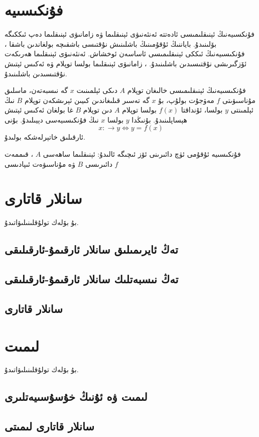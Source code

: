 \section{فۇنكىسىيە}
فۇنكسىيەنىڭ ئېنىقلىمىسى ئادەتتە ئەنئەنىۋى ئېنىقلىما ۋە زامانىۋى ئېنىقلىما دەپ ئىككىگە بۆلىنىدۇ. باياننىڭ ئۇقۇمىنىڭ باشلىنىش نۇقتىسى باشقىچە بولغاندىن باشقا ، فۇنكىسىيەنىڭ ئىككى ئېنىقلىمىسى ئاساسەن ئوخشاش. ئەنئەنىۋى ئېنىقلىما ھەرىكەت ئۆزگىرىشى نۇقتىسىدىن باشلىنىدۇ. ، زامانىۋى ئېنىقلىما بولسا توپلام ۋە ئەكىس ئېتىش نۇقتىسىدىن باشلىنىدۇ.

\begin{MyDefinition}{فۇنكىسىيەنىڭ ئېنىقلىمىسى}{}
 خالىغان توپلام $A$ دىكى ئېلمىنىت $x$ گە نىسبەتەن، ماسلىق مۇناسىۋىتى $f$ مەۋجۇت بولۇپ، بۇ $x$ گە تەسىر قىلىغاندىن كىيىن ئېرىشكەن توپلام $B$ نىڭ ئېلمىنتى $y$ بولسا، ئۇنداقتا $f(x)$ بولسا توپلام $A$ دىن توپلام $B$ غا بولغان ئەكىس ئېتىش ھېساپلىنىدۇ. بۇنىڭدا $y$ بولسا $x$ نىڭ فۇنكىسىيەسى دېيىلىدۇ. بۇنى 
 $$x:\rightarrow y \Leftrightarrow y=f(x)$$
 ئارقىلىق خاتېرلەشكە بولىدۇ.
\end{MyDefinition}
فۇنكىسىيە ئۇقۇمى ئۈچ دائىرىنى ئۆز ئىچىگە ئالىدۇ: ئېنىقلىما ساھەسى $A$ ، قىممەت دائىرىسى $B$ ۋە مۇناسىۋەت ئىپادىسى $f$

\section{سانلار قاتارى}
بۇ بۆلەك تولۇقلىنىلىۋاتىدۇ.
\subsection{تەڭ ئايرىمىلىق سانلار ئارقىمۇ-ئارقىلىقى}
\subsection{تەڭ نىسبەتلىك سانلار ئارقىمۇ-ئارقىلىقى}
\subsection{سانلار قاتارى}

\section{لىمىت}
بۇ بۆلەك تولۇقلىنىلىۋاتىدۇ.
\subsection{لىمىت ۋە ئۇنىڭ خۇسۇسىيەتلىرى}
\subsection{سانلار قاتارى لىمىتى}
